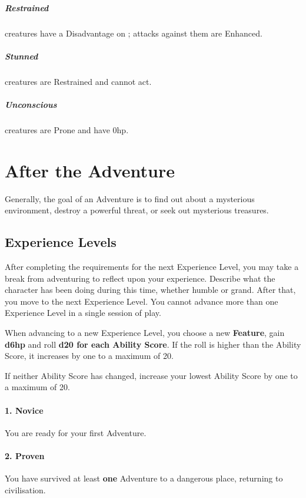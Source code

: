 \documentclass[itdr]{subfiles}
\begin{document}
\subparagraph{Restrained} creatures have a Disadvantage on ; attacks against them are Enhanced.

\subparagraph{Stunned} creatures are Restrained and cannot act.

\subparagraph{Unconscious} creatures are Prone and have 0hp.

\break

\section{After the Adventure}

Generally, the goal of an Adventure is to find out about a mysterious environment, destroy a powerful threat, or seek out mysterious treasures.

\vfill
\subsection{Experience Levels}
After completing the requirements for the next Experience Level, you may take a break from adventuring to reflect upon your experience. Describe what the character has been doing during this time, whether humble or grand. After that, you move to the next Experience Level. You cannot advance more than one Experience Level in a single session of play.

When advancing to a new Experience Level, you choose a new \textbf{Feature}, gain \textbf{d6hp} and roll \textbf{d20 for each Ability Score}. If the roll is higher than the Ability Score, it increases by one to a maximum of 20.

If neither Ability Score has changed, increase your lowest Ability Score by one to a maximum of 20.

\paragraph{1. Novice}
You are ready for your first Adventure.

\paragraph{2. Proven}
You have survived at least \textbf{one} Adventure to a dangerous place, returning to civilisation.
\end{document}
